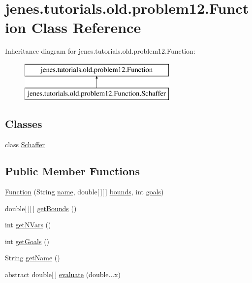 \hypertarget{classjenes_1_1tutorials_1_1old_1_1problem12_1_1_function}{\section{jenes.\-tutorials.\-old.\-problem12.\-Function Class Reference}
\label{classjenes_1_1tutorials_1_1old_1_1problem12_1_1_function}
}
Inheritance diagram for jenes.\-tutorials.\-old.\-problem12.\-Function\-:\begin{figure}[H]
\begin{center}
\leavevmode
\includegraphics[height=2.000000cm]{classjenes_1_1tutorials_1_1old_1_1problem12_1_1_function}
\end{center}
\end{figure}
\subsection*{Classes}
\begin{DoxyCompactItemize}
\item 
class \hyperlink{classjenes_1_1tutorials_1_1old_1_1problem12_1_1_function_1_1_schaffer}{Schaffer}
\end{DoxyCompactItemize}
\subsection*{Public Member Functions}
\begin{DoxyCompactItemize}
\item 
\hyperlink{classjenes_1_1tutorials_1_1old_1_1problem12_1_1_function_a9c5f78b0b4d831eebec0071baa79f8ee}{Function} (String \hyperlink{classjenes_1_1tutorials_1_1old_1_1problem12_1_1_function_a6cc32f98e4932a3251cbaffdf08b9773}{name}, double\mbox{[}$\,$\mbox{]}\mbox{[}$\,$\mbox{]} \hyperlink{classjenes_1_1tutorials_1_1old_1_1problem12_1_1_function_a0a732b2084fd09b6d69858b21a780a05}{bounds}, int \hyperlink{classjenes_1_1tutorials_1_1old_1_1problem12_1_1_function_a9ad846e268721b5a9d5d3e15763d5400}{goals})
\item 
double\mbox{[}$\,$\mbox{]}\mbox{[}$\,$\mbox{]} \hyperlink{classjenes_1_1tutorials_1_1old_1_1problem12_1_1_function_ae97b45b0a6c1d5db782a138e06d2f076}{get\-Bounds} ()
\item 
int \hyperlink{classjenes_1_1tutorials_1_1old_1_1problem12_1_1_function_af412a211a5270eb27376db8cd0bc704d}{get\-N\-Vars} ()
\item 
int \hyperlink{classjenes_1_1tutorials_1_1old_1_1problem12_1_1_function_ae5415395c7c1fde07fbc5581afa0273c}{get\-Goals} ()
\item 
String \hyperlink{classjenes_1_1tutorials_1_1old_1_1problem12_1_1_function_a48a0197bf768aca5fc8154613cd30e8d}{get\-Name} ()
\item 
abstract double\mbox{[}$\,$\mbox{]} \hyperlink{classjenes_1_1tutorials_1_1old_1_1problem12_1_1_function_aa1f4a7947b903e4ae9b9617940d4ed03}{evaluate} (double...\-x)
\end{DoxyCompactItemize}
